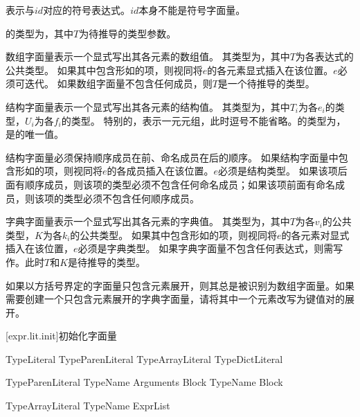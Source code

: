 \pnum
{}表示与$id$对应的符号表达式。$id$本身不能是符号字面量。

\pnum
{}的类型为，其中$T$为待推导的类型参数。

\pnum
数组字面量\tcode{[$e_1$, $\ldots$, $e_n$]}表示一个显式写出其各元素的数组值。
其类型为，其中$T$为各表达式的公共类型。
如果其中包含形如的项，则视同将$e$的各元素显式插入在该位置。$e$必须可迭代。
如果数组字面量不包含任何成员，则$T$是一个待推导的类型。

\pnum
结构字面量表示一个显式写出其各元素的结构值。
其类型为，其中$T_i$为各$e_i$的类型，$U_i$为各$f_i$的类型。
特别的，表示一元元组，此时逗号不能省略。\tcode{()}的类型为，是的唯一值。

\pnum
结构字面量必须保持顺序成员在前、命名成员在后的顺序。
如果结构字面量中包含形如的项，则视同将$e$的各成员插入在该位置。$e$必须是结构类型。
如果该项后面有顺序成员，则该项的类型必须不包含任何命名成员；如果该项前面有命名成员，则该项的类型必须不包含任何顺序成员。

\pnum
字典字面量\tcode{[$k_1$:$v_1$, $k_2$:$v_2$, $\ldots$, $k_n$:$v_n$]}表示一个显式写出其各元素的字典值。
其类型为，其中$T$为各$v_i$的公共类型，$K$为各$k_i$的公共类型。
如果其中包含形如的项，则视同将$e$的各元素对显式插入在该位置，$e$必须是字典类型。
如果字典字面量不包含任何表达式，则需写作\tcode{[:]}。此时$T$和$K$是待推导的类型。

\pnum
如果以方括号界定的字面量只包含元素展开，则其总是被识别为数组字面量。\enternote 如果需要创建一个只包含元素展开的字典字面量，请将其中一个元素改写为键值对的展开。\exitnote

[expr.lit.init]{初始化字面量}

\begin{bnf}{TypeLiteral}
    TypeParenLiteral \br
    TypeArrayLiteral \br
    TypeDictLiteral
\end{bnf}

\begin{bnf}{TypeParenLiteral}
    TypeName \terminal{(} Arguments\bnfq \terminal{)} Block\bnfq \br
    TypeName Block
\end{bnf}

\begin{bnf}{TypeArrayLiteral}
    TypeName \terminal{[} ExprList\bnfq \terminal{]}
\end{bnf}

